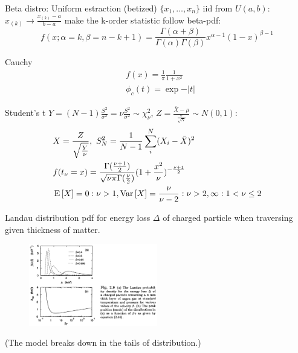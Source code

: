 \documentclass[asd-beamer.tex]{subfiles}%
\begin{document}
\begin{frame}{Beta distro: Uniform estraction (betized)}
$\{x_1,\ldots,x_n\}$ iid from $U(a,b)$: $x_{(k)}\to\frac{x_{(k)}-a}{b-a}$ make the k-order statistic follow beta-pdf:
\[f(x;\alpha=k,\beta=n-k+1)=\frac{\Gamma(\alpha+\beta)}{\Gamma(\alpha)\Gamma(\beta)}x^{\alpha-1}(1-x)^{\beta-1}\]
\end{frame}

\begin{frame}{Cauchy}
\begin{align*}
&f(x)=\frac{1}{\pi}\frac{1}{1+x^2}\\
&\phi_c(t)=\exp{-|t|}
\end{align*}
\end{frame}

\begin{frame}{Student's t}
    $Y=(N-1)\frac{S^2}{\sigma^2}=\nu \frac{S^2}{\sigma^2}\sim\chi^2_{\nu}$, $Z=\frac{\bar{X}-\mu}{\frac{\sigma}{\sqrt{N}}}\sim N(0,1)$:
\begin{align*}
&X=\frac{Z}{\sqrt{\frac{Y}{\nu}}},\ S_N^2=\frac{1}{N-1}\sum_i^N(X_i-\bar{X})^2\\
&f(t_{\nu}=x)=\frac{\Gamma(\frac{\nu+1}{2})}{\sqrt{\nu\pi}\Gamma(\frac{\nu}{2})}(1+\frac{x^2}{\nu})^{-\frac{\nu+1}{2}}\\
&\E{[X]}=0: \nu>1, \var{[X]}=\frac{\nu}{\nu-2}: \nu>2, \infty: 1<\nu\leq2
\end{align*}
\end{frame}

\begin{frame}{Landau distribution}
pdf for energy loss $\Delta$ of charged particle when traversing given thickness of matter.
\begin{figure}[!ht]\includegraphics[trim={0cm 0cm 0 0},clip, keepaspectratio,width=0.5\textwidth]{figures/cowan/probability/landautails}\label{fig:landautails}\end{figure}
(The model breaks down in the tails of distribution.)
\end{frame}
\end{document}

